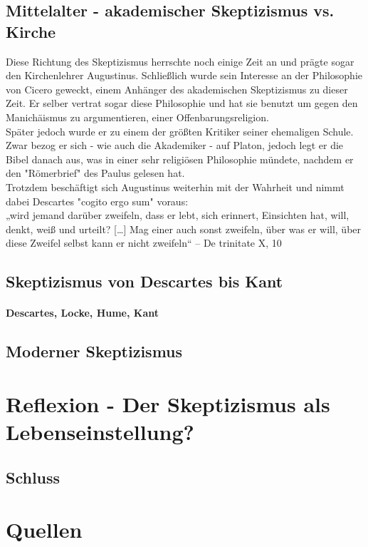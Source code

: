 \documentclass[12pt,a4paper]{article}
\begin{document}
	\subsection{Mittelalter - akademischer Skeptizismus vs. Kirche}
Diese Richtung des Skeptizismus herrschte noch einige Zeit an und prägte sogar den Kirchenlehrer Augustinus. Schließlich wurde sein Interesse an der Philosophie von Cicero geweckt, einem Anhänger des akademischen Skeptizismus zu dieser Zeit. Er selber vertrat sogar diese Philosophie und hat sie benutzt um gegen den Manichäismus zu argumentieren, einer Offenbarungsreligion.\\
Später jedoch wurde er zu einem der größten Kritiker seiner ehemaligen Schule. Zwar bezog er sich - wie auch die Akademiker - auf Platon, jedoch legt er die Bibel danach aus, was in einer sehr religiösen Philosophie mündete, nachdem er den "Römerbrief" des Paulus gelesen hat.\\
Trotzdem beschäftigt sich Augustinus weiterhin mit der Wahrheit und nimmt dabei Descartes "cogito ergo sum" voraus:\\
„wird jemand darüber zweifeln, dass er lebt, sich erinnert, Einsichten hat, will, denkt, weiß und urteilt? […] Mag einer auch sonst zweifeln, über was er will, über diese Zweifel selbst kann er nicht zweifeln“
– De trinitate X, 10%
	\subsection{Skeptizismus von Descartes bis Kant}
		\paragraph{Descartes, Locke, Hume, Kant}
	\subsection{Moderner Skeptizismus}
\section{Reflexion - Der Skeptizismus als Lebenseinstellung?}
	\subsection{Schluss}


\section*{Quellen}
\end{document}
